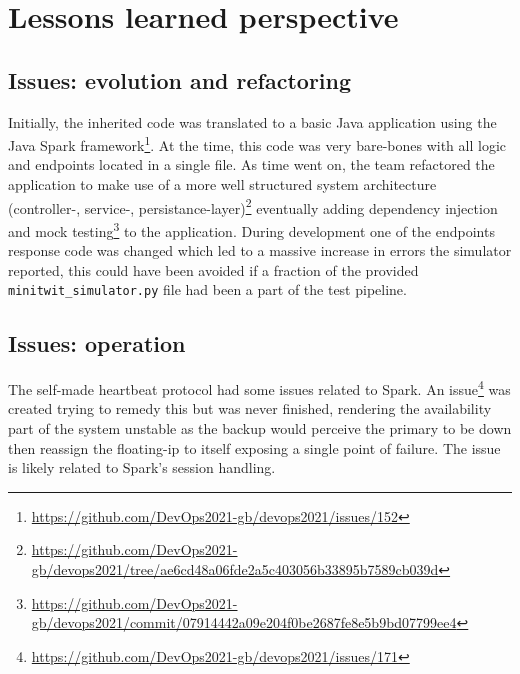 \section{Lessons learned perspective} \label{section:Lessons learned perspective}
\subsection{Issues: evolution and refactoring}
Initially, the inherited code was translated to a basic Java application using the Java Spark framework\footnote{\url{https://github.com/DevOps2021-gb/devops2021/issues/152}}. At the time, this code was very bare-bones with all logic and endpoints located in a single file. As time went on, the team refactored the application to make use of a more well structured system architecture (controller-, service-, persistance-layer)\footnote{\url{https://github.com/DevOps2021-gb/devops2021/tree/ae6cd48a06fde2a5c403056b33895b7589cb039d}} eventually adding dependency injection and mock testing\footnote{\url{https://github.com/DevOps2021-gb/devops2021/commit/07914442a09e204f0be2687fe8e5b9bd07799ee4}} to the application. 
During development one of the endpoints response code was changed which led to a massive increase in errors the simulator reported, this could have been avoided if a fraction of the provided \texttt{minitwit\_simulator.py} file had been a part of the test pipeline.

\subsection{Issues: operation}
\label{issues-operation}
The self-made heartbeat protocol had some issues related to Spark. An issue\footnote{\url{https://github.com/DevOps2021-gb/devops2021/issues/171}} was created trying to remedy this but was never finished, rendering the availability part of the system unstable as the backup would perceive the primary to be down then reassign the floating-ip to itself exposing a single point of failure. The issue is likely related to Spark's session handling.


